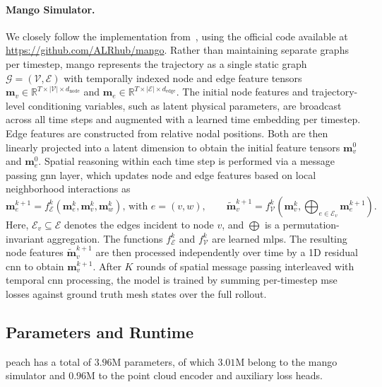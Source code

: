 \paragraph{Mango Simulator.}\label{app:mango}
We closely follow the implementation from~\citep{dahlinger2025mango}, using the official code available at \url{https://github.com/ALRhub/mango}. Rather than maintaining separate graphs per timestep, \gls{mango} represents the trajectory as a single static graph $\mathcal{G} = (\mathcal{V}, \mathcal{E})$ with temporally indexed node and edge feature tensors $\mathbf{m}_v \in \mathbb{R}^{T \times |\mathcal{V}| \times d_\text{node}}$ and $\mathbf{m}_e \in \mathbb{R}^{T \times |\mathcal{E}| \times d_\text{edge}}$. The initial node features and trajectory-level conditioning variables, such as latent physical parameters, are broadcast across all time steps and augmented with a learned time embedding per timestep. Edge features are constructed from relative nodal positions. Both are then linearly projected into a latent dimension to obtain the initial feature tensors $\mathbf{m}_v^0$ and $\mathbf{m}_e^0$.
Spatial reasoning within each time step is performed via a message passing \gls{gnn} layer, which updates node and edge features based on local neighborhood interactions as
\begin{equation*}
    \mathbf m_e^{k+1} = f_\mathcal{E}^k(\mathbf m_e ^k, \mathbf m_v ^k, \mathbf m_w ^k)\text{, with } e=(v, w), \qquad \tilde {\mathbf m}_v^{k+1} = f_\mathcal{V}^k(\mathbf m_v ^k, \bigoplus_{e \in \mathcal{E}_v} \mathbf m_e ^{k+1}).
\end{equation*}
Here, $\mathcal{E}_v \subseteq \mathcal{E}$ denotes the edges incident to node $v$, and $\bigoplus$ is a permutation-invariant aggregation. The functions $f_\mathcal{E}^k$ and $f_\mathcal{V}^k$ are learned \glspl{mlp}.
The resulting node features $\tilde{\mathbf{m}}_v^{k+1}$ are then processed independently over time by a 1D residual \gls{cnn} to obtain $\mathbf{m}_v^{k+1}$. After $K$ rounds of spatial message passing interleaved with temporal \gls{cnn} processing, the model is trained by summing per-timestep \gls{mse} losses against ground truth mesh states over the full rollout.

\subsection{Parameters and Runtime}
\label{sec:runtime}
\gls{peach} has a total of $3.96$M parameters, of which $3.01$M belong to the \gls{mango} simulator and $0.96$M to the point cloud encoder and auxiliary loss heads.

